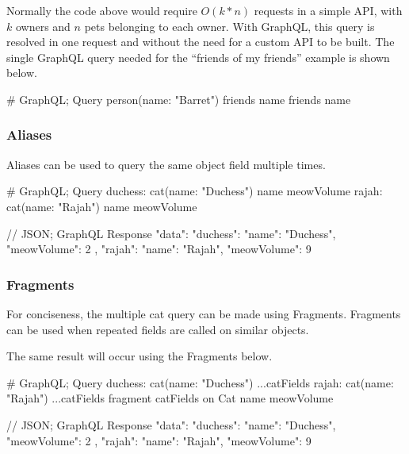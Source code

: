 \documentclass[stat,dissertation]{puthesis}\usepackage[]{graphicx}\usepackage{xcolor}
\begin{document}
Normally the code above would require $O(k * n)$ requests in a simple API, with $k$ owners and $n$ pets belonging to each owner.  With GraphQL, this query is resolved in one request and without the need for a custom API to be built.  The single GraphQL query needed for the ``friends of my friends'' example is shown below.

\begin{graphqlcode}
# GraphQL; Query
{
  person(name: "Barret") {
    friends {
      name
      friends {
        name
      }}}}
\end{graphqlcode}






\subsubsection{Aliases}

Aliases can be used to query the same object field multiple times.


\begin{graphqlcode}
# GraphQL; Query
{
  duchess: cat(name: "Duchess") {
    name
    meowVolume
  }
  rajah: cat(name: "Rajah") {
    name
    meowVolume
  }}
\end{graphqlcode}

\begin{jscode}
// JSON; GraphQL Response
{
  "data": {
    "duchess": {
      "name": "Duchess",
      "meowVolume": 2
    },
    "rajah": {
      "name": "Rajah",
      "meowVolume": 9
    }}}
\end{jscode}



\subsubsection{Fragments}

For conciseness, the multiple cat query can be made using Fragments.  Fragments can be used when repeated fields are called on similar objects.

The same result will occur using the Fragments below.

\begin{graphqlcode}
# GraphQL; Query
{
  duchess: cat(name: "Duchess") {
    ...catFields
  }
  rajah: cat(name: "Rajah") {
    ...catFields
  }
}
fragment catFields on Cat {
  name
  meowVolume
}
\end{graphqlcode}
\begin{jscode}
// JSON; GraphQL Response
{
  "data": {
    "duchess": {
      "name": "Duchess",
      "meowVolume": 2
    },
    "rajah": {
      "name": "Rajah",
      "meowVolume": 9
    }}}
\end{jscode}
\end{document}
